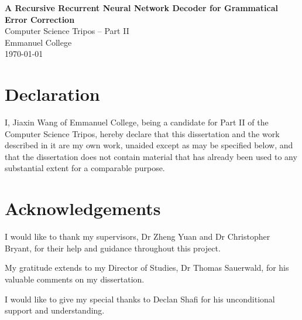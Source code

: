 \documentclass[12pt,a4paper,twoside]{report}
\begin{document}




\pagestyle{empty}


\vspace*{60mm}
\begin{center}
\Huge
\textbf{A Recursive Recurrent Neural Network Decoder for Grammatical Error Correction} \\[5mm]
Computer Science Tripos -- Part II \\[5mm]
Emmanuel College \\[5mm]


\today  %

\end{center}
\thispagestyle{empty}

\pagestyle{plain}
\newpage

\section*{Declaration}

I, Jiaxin Wang of Emmanuel College, being a candidate for Part II of the Computer
Science Tripos, hereby declare that this dissertation and the work described in
it are my own work, unaided except as may be specified below, and that the dissertation
does not contain material that has already been used to any substantial
extent for a comparable purpose.

\bigskip
{}

\medskip
{}

\section*{Acknowledgements}
I would like to thank my supervisors, Dr Zheng Yuan and Dr Christopher Bryant, for their help and guidance throughout this project.

My gratitude extends to my Director of Studies, Dr Thomas Sauerwald, for his valuable comments on my dissertation.

I would like to give my special thanks to Declan Shafi for his unconditional support and understanding.
\end{document}
